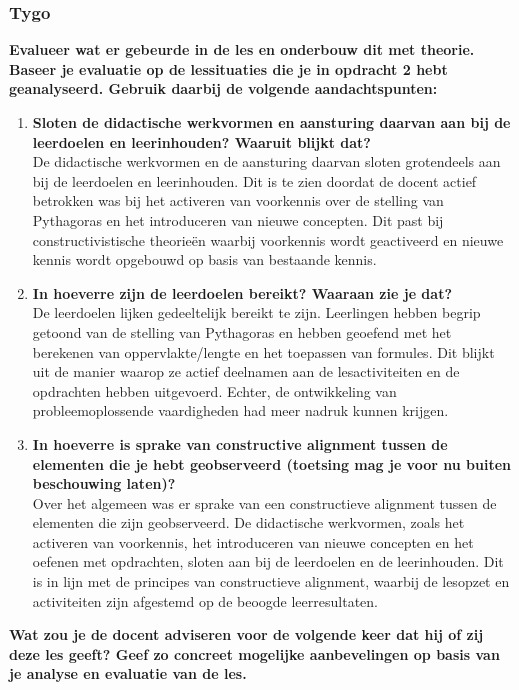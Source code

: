 \documentclass{article}
\begin{document}
            \subsubsection{Tygo}
                \textbf{Evalueer wat er gebeurde in de les en onderbouw dit met theorie. Baseer je evaluatie op de lessituaties die je in opdracht 2 hebt geanalyseerd. Gebruik daarbij de volgende aandachtspunten: }
                \begin{enumerate}[label=(\alph*)]
                    \item \textbf{Sloten de didactische werkvormen en aansturing daarvan aan bij de leerdoelen en leerinhouden? Waaruit blijkt dat?} \\
                        De didactische werkvormen en de aansturing daarvan sloten grotendeels aan bij de leerdoelen en leerinhouden. Dit is te zien doordat de docent actief betrokken was bij het activeren van voorkennis over de stelling van Pythagoras en het introduceren van nieuwe concepten. Dit past bij constructivistische theorieën waarbij voorkennis wordt geactiveerd en nieuwe kennis wordt opgebouwd op basis van bestaande kennis.
                    \item \textbf{In hoeverre zijn de leerdoelen bereikt? Waaraan zie je dat?} \\
                        De leerdoelen lijken gedeeltelijk bereikt te zijn. Leerlingen hebben begrip getoond van de stelling van Pythagoras en hebben geoefend met het berekenen van oppervlakte/lengte en het toepassen van formules. Dit blijkt uit de manier waarop ze actief deelnamen aan de lesactiviteiten en de opdrachten hebben uitgevoerd. Echter, de ontwikkeling van probleemoplossende vaardigheden had meer nadruk kunnen krijgen.
                    \item \textbf{In hoeverre is sprake van constructive alignment tussen de elementen die je hebt geobserveerd (toetsing mag je voor nu buiten beschouwing laten)?} \\
                        Over het algemeen was er sprake van een constructieve alignment tussen de elementen die zijn geobserveerd. De didactische werkvormen, zoals het activeren van voorkennis, het introduceren van nieuwe concepten en het oefenen met opdrachten, sloten aan bij de leerdoelen en de leerinhouden. Dit is in lijn met de principes van constructieve alignment, waarbij de lesopzet en activiteiten zijn afgestemd op de beoogde leerresultaten.
                \end{enumerate}
                \textbf{Wat zou je de docent adviseren voor de volgende keer dat hij of zij deze les geeft? Geef zo concreet mogelijke aanbevelingen op basis van je analyse en evaluatie van de les.} \\
\end{document}
